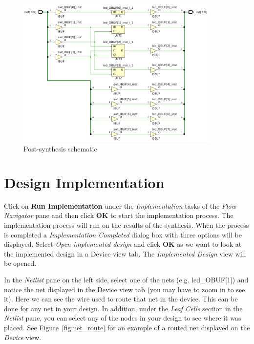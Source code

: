 \documentclass[11pt]{article}
\begin{document}
\begin{figure}[!h]
    \centering
    \includegraphics[width=0.9\textwidth]{images/schem_post_syn.png}
    \caption{Post-synthesis schematic}
    \label{fig:schem2}
\end{figure}




\section{Design Implementation}
\label{sec:impl}
Click on \textbf{Run Implementation} under the \textit{Implementation} tasks of the \textit{Flow Navigator} pane and then click \textbf{OK} to start the implementation process. The implementation process will run on the results of the synthesis. When the process is completed a \textit{Implementation Completed} dialog box with three options will be displayed. Select \textit{Open implemented design} and click \textbf{OK} as we want to look at the implemented design in a Device view tab. The \textit{Implemented Design} view will be opened.

In the \textit{Netlist} pane on the left side, select one of the nets (e.g. led\_OBUF[1]) and notice the net displayed in the Device view tab (you may have to zoom in to see it). Here we can see the wire used to route that net in the device. This can be done for any net in your design. In addition, under the \textit{Leaf Cells} section in the \textit{Netlist} pane, you can select any of the nodes in your design to see where it was placed. See Figure~\ref{fig:net_route} for an example of a routed net displayed on the \textit{Device} view.
\end{document}
